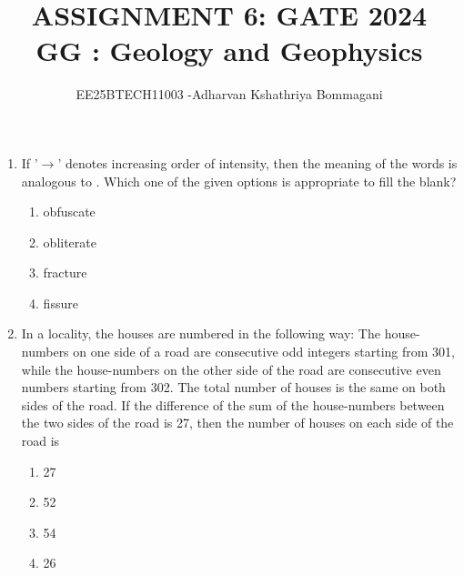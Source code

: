 \documentclass[journal,12pt,onecolumn]{IEEEtran}
\begin{document}
\title{
ASSIGNMENT 6: GATE 2024\\
GG : Geology and Geophysics}
\author{EE25BTECH11003 -Adharvan Kshathriya Bommagani}
\maketitle

\begin{enumerate}

\item If '$\rightarrow$' denotes increasing order of intensity, then the meaning of the words  is analogous to . Which one of the given options is appropriate to fill the blank?

\hfill{}

\begin{multicols}{4}
\begin{enumerate}
    \item obfuscate
    \item obliterate
    \item fracture
    \item fissure
\end{enumerate}
\end{multicols}

\item In a locality, the houses are numbered in the following way: The house-numbers on one side of a road are consecutive odd integers starting from 301, while the house-numbers on the other side of the road are consecutive even numbers starting from 302. The total number of houses is the same on both sides of the road. If the difference of the sum of the house-numbers between the two sides of the road is 27, then the number of houses on each side of the road is

\hfill{}

\begin{multicols}{4}
\begin{enumerate}
    \item 27
    \item 52
    \item 54
    \item 26
\end{enumerate}
\end{multicols}


\end{enumerate}
\end{document}
